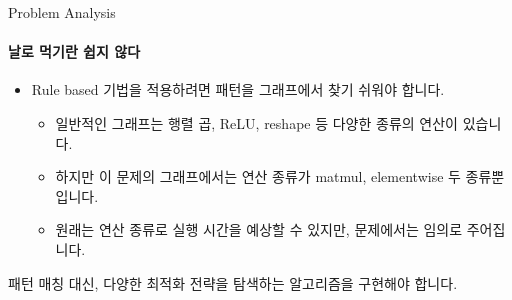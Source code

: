 \begin{frame}{Problem Analysis}
\framesubtitle{날로 먹기란 쉽지 않다}

\begin{itemize}
  \item Rule based 기법을 적용하려면 패턴을 그래프에서 찾기 쉬워야 합니다.
  \begin{itemize}
    \item 일반적인 그래프는 행렬 곱, ReLU, reshape 등 다양한 종류의 연산이 있습니다.
    \pause
    \item 하지만 이 문제의 그래프에서는 연산 종류가 matmul, elementwise 두 종류뿐입니다.
    \item 원래는 연산 종류로 실행 시간을 예상할 수 있지만, 문제에서는 임의로 주어집니다.
  \end{itemize}
\end{itemize}

\pause
\begin{figure}
  \centering
\end{figure}

\pause
\begin{tcolorbox}[title={전체적인 전략}]
  패턴 매칭 대신, 다양한 최적화 전략을 탐색하는 알고리즘을 구현해야 합니다.
\end{tcolorbox}
\end{frame}